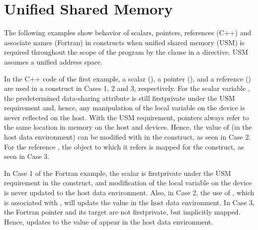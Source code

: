 \section{Unified Shared Memory}
\label{sec:usm}



The following examples show behavior of scalars, pointers, references (C++) and 
associate names (Fortran) in  constructs when
unified shared memory (USM) is required throughout the scope of the program by the 
 clause in a  directive.
USM assumes a unified address space.

\begin{cppspecific}
In the C++ code of the first example, a scalar (), a pointer 
(), and a reference () are used in a  construct in Cases 1, 2 and 3, respectively.
For the scalar variable , the predetermined data-sharing attribute is still
firstprivate under the USM requirement and, hence, any manipulation of the local variable on the device is never reflected on the host.
With the USM requirement, pointers always refer to the same location in memory on the host and devices.
Hence, the value of  (in the host data environment) can be modified with  in 
the  construct, as seen in Case 2. 
For the reference , the object to which it refers is mapped for  
the  construct, as seen in Case 3. 

\end{cppspecific}

\begin{fortranspecific}
In Case 1 of the Fortran example, the scalar  is firstprivate under the USM requirement
in the  construct, and modification of the local variable on the device is 
never updated to the host data environment.
Also, in Case 2, the use of , which is associated with , 
will update the  value in the host data environment.
In Case 3, the Fortran pointer  and its target  are not firstprivate, 
but implicitly mapped.  Hence, updates to the value of  appear in the host data environment.


{}
\end{fortranspecific}
